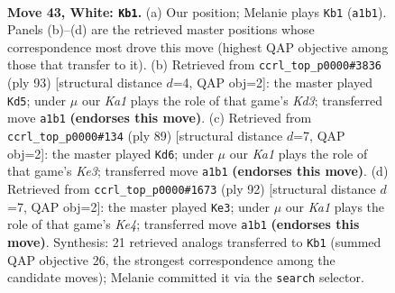 \documentclass[11pt]{article}
\begin{document}
\clearpage

\begin{figure}[p]\centering
\begin{subfigure}{0.46\textwidth}\centering
\resizebox{\linewidth}{!}{%
\newchessgame
\chessboard[
  setfen={6k1/3N4/8/8/2p2P2/1pP1p3/8/K7 w - - 0 43},
  showmover=false,
  pgfstyle=straightmove, color=movearrow, markmove={a1-b1}
]}
\caption{}
\end{subfigure}\hfill
\begin{subfigure}{0.46\textwidth}\centering
\resizebox{\linewidth}{!}{%
\newchessgame
\chessboard[
  setfen={8/8/3k4/5p2/1K3P1p/4P3/7P/8 b - - 0 47},
  showmover=false,
  pgfstyle=straightmove, color=movearrow, markmove={d6-d5}
]}
\caption{}
\end{subfigure}
\\[4pt]
\begin{subfigure}{0.46\textwidth}\centering
\resizebox{\linewidth}{!}{%
\newchessgame
\chessboard[
  setfen={8/7p/4k3/6p1/3K2P1/7P/8/8 b - - 5 45},
  showmover=false,
  pgfstyle=straightmove, color=movearrow, markmove={e6-d6}
]}
\caption{}
\end{subfigure}\hfill
\begin{subfigure}{0.46\textwidth}\centering
\resizebox{\linewidth}{!}{%
\newchessgame
\chessboard[
  setfen={8/6p1/4k2p/7P/4K3/6P1/8/8 w - - 1 47},
  showmover=false,
  pgfstyle=straightmove, color=movearrow, markmove={e4-e3}
]}
\caption{}
\end{subfigure}
\caption{\textbf{Move 43, White: \texttt{Kb1}.} (a) Our position; Melanie plays \texttt{Kb1} (\texttt{a1b1}). Panels (b)--(d) are the retrieved master positions whose correspondence most drove this move (highest QAP objective among those that transfer to it). (b) Retrieved from \texttt{ccrl\_top\_p0000\#3836} (ply 93) [structural distance $d$=4, QAP obj=2]: the master played \texttt{Kd5}; under $\mu$ our \emph{Ka1} plays the role of that game's \emph{Kd3}; transferred move \texttt{a1b1} \textbf{(endorses this move)}. (c) Retrieved from \texttt{ccrl\_top\_p0000\#134} (ply 89) [structural distance $d$=7, QAP obj=2]: the master played \texttt{Kd6}; under $\mu$ our \emph{Ka1} plays the role of that game's \emph{Ke3}; transferred move \texttt{a1b1} \textbf{(endorses this move)}. (d) Retrieved from \texttt{ccrl\_top\_p0000\#1673} (ply 92) [structural distance $d$=7, QAP obj=2]: the master played \texttt{Ke3}; under $\mu$ our \emph{Ka1} plays the role of that game's \emph{Ke4}; transferred move \texttt{a1b1} \textbf{(endorses this move)}. Synthesis: 21 retrieved analogs transferred to \texttt{Kb1} (summed QAP objective 26, the strongest correspondence among the candidate moves); Melanie committed it via the \texttt{search} selector.}
\label{fig:thought-m84}
\end{figure}
\end{document}
